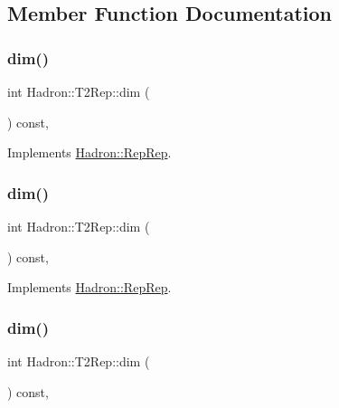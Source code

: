 \subsection{Member Function Documentation}
\mbox{\label{structHadron_1_1T2Rep_a06553069af895fb049a99d50612cba44}} 
\subsubsection{\texorpdfstring{dim()}{dim()}\hspace{0.1cm}{\footnotesize\ttfamily [1/5]}}
{\footnotesize\ttfamily int Hadron\+::\+T2\+Rep\+::dim (\begin{DoxyParamCaption}{ }\end{DoxyParamCaption}) const\hspace{0.3cm}{\ttfamily [inline]}, {\ttfamily [virtual]}}



Implements \mbox{\hyperlink{structHadron_1_1RepRep_a92c8802e5ed7afd7da43ccfd5b7cd92b}{Hadron\+::\+Rep\+Rep}}.

\mbox{\label{structHadron_1_1T2Rep_a06553069af895fb049a99d50612cba44}} 
\subsubsection{\texorpdfstring{dim()}{dim()}\hspace{0.1cm}{\footnotesize\ttfamily [2/5]}}
{\footnotesize\ttfamily int Hadron\+::\+T2\+Rep\+::dim (\begin{DoxyParamCaption}{ }\end{DoxyParamCaption}) const\hspace{0.3cm}{\ttfamily [inline]}, {\ttfamily [virtual]}}



Implements \mbox{\hyperlink{structHadron_1_1RepRep_a92c8802e5ed7afd7da43ccfd5b7cd92b}{Hadron\+::\+Rep\+Rep}}.

\mbox{\label{structHadron_1_1T2Rep_a06553069af895fb049a99d50612cba44}} 
\subsubsection{\texorpdfstring{dim()}{dim()}\hspace{0.1cm}{\footnotesize\ttfamily [3/5]}}
{\footnotesize\ttfamily int Hadron\+::\+T2\+Rep\+::dim (\begin{DoxyParamCaption}{ }\end{DoxyParamCaption}) const\hspace{0.3cm}{\ttfamily [inline]}, {\ttfamily [virtual]}}




